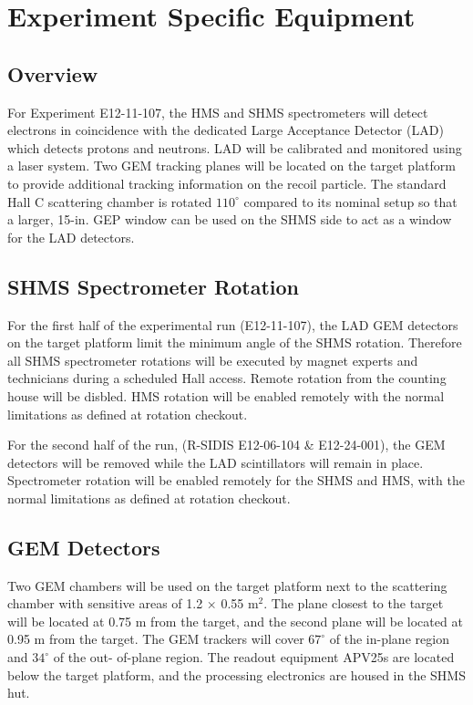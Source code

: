 
\chapter{Experiment Specific Equipment}
\label{chap:expspecific}


\section{Overview}
For Experiment E12-11-107, the HMS and SHMS spectrometers will detect electrons in
coincidence with the dedicated Large Acceptance Detector (LAD) which detects protons
and neutrons. LAD will be calibrated and monitored using a laser system. Two GEM
tracking planes will be located on the target platform to provide additional tracking
information on the recoil particle. The standard Hall C scattering chamber is rotated
$110^\circ$ compared to its nominal setup so that a larger, 15-in. GEP window can be used on
the SHMS side to act as a window for the LAD detectors.

\section{SHMS Spectrometer Rotation}
For the first half of the experimental run (E12-11-107), the LAD GEM detectors on the target platform limit the minimum angle of the SHMS rotation.  Therefore all SHMS spectrometer rotations will be executed by magnet experts and technicians during a scheduled Hall access.  Remote rotation from the counting house will be disbled.  HMS rotation will be enabled remotely with the normal limitations as defined at rotation checkout.

For the second half of the run, (R-SIDIS E12-06-104 \& E12-24-001), the GEM detectors will be removed while the LAD scintillators will remain in place.  Spectrometer rotation will be enabled remotely for the SHMS and HMS, with the normal limitations as defined at rotation checkout.



\section{GEM Detectors}
Two GEM chambers will be used on the target platform next to the scattering
chamber with sensitive areas of 1.2 × 0.55 m$^2$. The plane closest to the target will be
located at 0.75 m from the target, and the second plane will be located at 0.95 m from
the target. The GEM trackers will cover $67^\circ$ of the in-plane region and $34^\circ$ of the out-
of-plane region. The readout equipment APV25s are located below the target platform,
and the processing electronics are housed in the SHMS hut.
